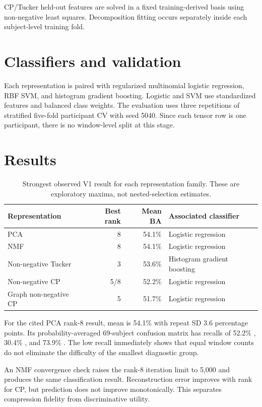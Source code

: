 CP/Tucker held-out features are solved in a fixed training-derived basis using
non-negative least squares. Decomposition fitting occurs separately inside each
subject-level training fold.

\section{Classifiers and validation}

Each representation is paired with regularized multinomial logistic regression,
RBF SVM, and histogram gradient boosting. Logistic and SVM use standardized
features and balanced class weights. The evaluation uses three repetitions of
stratified five-fold participant CV with seed 5040. Since each tensor row is one
participant, there is no window-level split at this stage.

\section{Results}

\begin{table}[htbp]
\centering
\begin{tabular}{lrrl}
\toprule
\textbf{Representation} & \textbf{Best rank} & \textbf{Mean BA} & \textbf{Associated classifier}\\
\midrule
PCA & 8 & 54.1\% & Logistic regression\\
NMF & 8 & 54.1\% & Logistic regression\\
Non-negative Tucker & 3 & 53.6\% & Histogram gradient boosting\\
Non-negative CP & 5/8 & 52.2\% & Logistic regression\\
Graph non-negative CP & 5 & 51.7\% & Logistic regression\\
\bottomrule
\end{tabular}
\caption{Strongest observed V1 result for each representation family. These are exploratory maxima, not nested-selection estimates.}
\label{tab:v1-results}
\end{table}

For the cited PCA rank-8 result, mean \BA{} is 54.1\% with repeat SD 3.6
percentage points. Its probability-averaged 69-subject confusion matrix has
recalls of 52.2\% \AD{}, 30.4\% \FTD{}, and 73.9\% \CN{}. The low \FTD{}
recall immediately shows that equal window counts do not eliminate the
difficulty of the smallest diagnostic group.

An NMF convergence check raises the rank-8 iteration limit to 5,000 and produces
the same classification result. Reconstruction error improves with rank for CP,
but prediction does not improve monotonically. This separates compression
fidelity from discriminative utility.

